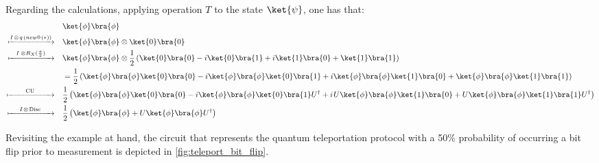 Regarding the calculations, applying operation $T$ to the state $\ket{\psi}$, one has that:
\begin{equation} \label{eq:operation_T}
  \begin{split}
  &\ket{\phi} \bra{\phi}\\
 \xmapsto{I \hspace{1pt} \otimes \hspace{1pt} q \hspace{1pt} (\textit{new}\hspace{1pt}0 \hspace{1pt}(*))} \quad & \ket{\phi} \bra{\phi} \otimes \ket{0} \bra{0} \\
  \xmapsto{\hspace{8pt} I \hspace{1pt} \hspace{1pt} \otimes R_{X}(\frac{\pi}{2})\hspace{8pt}} \quad  & \ket{\phi} \bra{\phi} \otimes \frac{1}{2} \left( \ket{0}\bra{0} -i \ket{0}\bra{1} + i \ket{1}\bra{0} + \ket{1}\bra{1} \right)  \\
  & = \frac{1}{2} \left( \ket{\phi} \bra{\phi}  \ket{0}\bra{0} -i \ket{\phi} \bra{\phi}\ket{0}\bra{1} + i \ket{\phi} \bra{\phi} \ket{1}\bra{0} + \ket{\phi} \bra{\phi}  \ket{1}\bra{1} \right) \\
  \xmapsto{\hspace{22pt} \text{CU} \hspace{22pt}} \quad & \frac{1}{2} \left( \ket{\phi} \bra{\phi} \ket{0}\bra{0} - i\ket{\phi} \bra{\phi}\ket{0}\bra{1} U^{\dag} + i \hspace{1pt} U\ket{\phi} \bra{\phi} \ket{1}\bra{0} + U \ket{\phi} \bra{\phi}  \ket{1}\bra{1}U^{\dag} \right) \\ 
  \xmapsto{\hspace{13pt} I \hspace{1pt}\otimes \hspace{1pt} \text{Disc} \hspace{14pt}} \quad & \frac{1}{2} \left(\ket{\phi} \bra{\phi} + U\ket{\phi} \bra{\phi}U^{\dag} \right) \\
  \end{split} 
\end{equation}

Revisiting the example at hand, the circuit that represents the quantum teleportation protocol with a 50\% probability of occurring a bit flip prior to measurement is depicted in \autoref{fig:teleport_bit_flip}.

